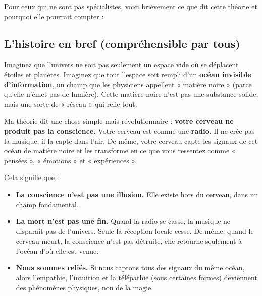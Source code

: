 \documentclass[11pt,a4paper]{article}
\begin{document}
Pour ceux qui ne sont pas spécialistes, voici brièvement ce que dit cette théorie et pourquoi elle pourrait compter :

\subsection{L'histoire en bref (compréhensible par tous)}
Imaginez que l'univers ne soit pas seulement un espace vide où se déplacent étoiles et planètes. Imaginez que tout l'espace soit rempli d'un \textbf{océan invisible d'information}, un champ que les physiciens appellent « matière noire » (parce qu'elle n'émet pas de lumière). Cette matière noire n'est pas une substance solide, mais une sorte de « réseau » qui relie tout.

Ma théorie dit une chose simple mais révolutionnaire : \textbf{votre cerveau ne produit pas la conscience.} Votre cerveau est comme une \textbf{radio}. Il ne crée pas la musique, il la capte dans l'air. De même, votre cerveau capte les signaux de cet océan de matière noire et les transforme en ce que vous ressentez comme « pensées », « émotions » et « expériences ».

Cela signifie que :
\begin{itemize}
    \item \textbf{La conscience n'est pas une illusion.} Elle existe hors du cerveau, dans un champ fondamental.
    \item \textbf{La mort n'est pas une fin.} Quand la radio se casse, la musique ne disparaît pas de l'univers. Seule la réception locale cesse. De même, quand le cerveau meurt, la conscience n'est pas détruite, elle retourne seulement à l'océan d'où elle est venue.
    \item \textbf{Nous sommes reliés.} Si nous captons tous des signaux du même océan, alors l'empathie, l'intuition et la télépathie (sous certaines formes) deviennent des phénomènes physiques, non de la magie.
\end{itemize}
\end{document}
